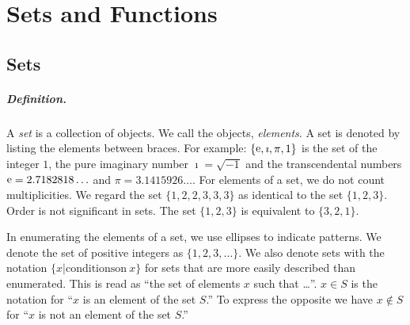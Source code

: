 \flushbottom



\chapter{Sets and Functions}




\section{Sets}


\paragraph{Definition.}
A \textit{set} is a collection of objects.  We call the objects, 
\textit{elements}.   A set is denoted by listing the elements between
braces.  For example: $\{\mathop{\mathrm{e}}\nolimits, \imath, \pi, 1\}$ is the set of the integer $1$, the 
pure imaginary number $\imath = \sqrt{-1}$ and the transcendental numbers
$\mathop{\mathrm{e}}\nolimits = 2.7182818\ldots$ and $\pi = 3.1415926\ldots$.   
For elements of a set, we do not count multiplicities.  We regard the set
$\{1, 2, 2, 3, 3, 3\}$ as identical to the set $\{1,2,3\}$.
Order is not significant in sets.  The set $\{1,2,3\}$ is equivalent to 
$\{3,2,1\}$.

In enumerating the elements of a set, we use ellipses to indicate 
patterns.  We denote the set of positive integers as $\{1, 2, 3, \ldots\}$.
We also denote sets with the notation $\{x | \mathrm{conditions on}\ x \}$
for sets that are more easily described than enumerated.  This is read as
``the set of elements $x$ such that \ldots''.  
$x \in S$ is the notation for ``$x$ is an element of the set $S$.''
To express the opposite we have $x \not\in S$ for 
``$x$ is not an element of the set $S$.''



